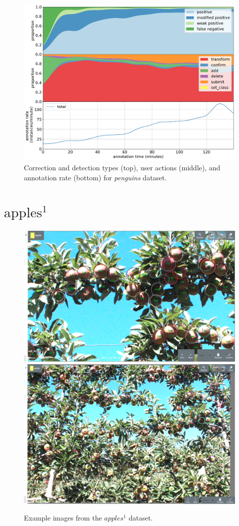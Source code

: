 \begin{figure}[!h]
\centering
\includegraphics[width=1.0\linewidth]{charts/action_annotations/penguins.pdf}
\caption{Correction and detection types (top), user actions (middle), and annotation rate (bottom) for \emph{penguins} dataset.}
\label{fig:penguin_annotation}
\end{figure}



\pagebreak
\section{\texorpdfstring{$\mathrm{apples^1}$}{}}
\label{sec:apples1_details}

\begin{figure}[!h]
  \includegraphics[width=0.475\linewidth]{figures/annotation/screenshots/apples_big.png}
  \hfill
  \includegraphics[width=0.45\linewidth]{figures/annotation/screenshots/apples_small.png}
\caption{Example images from the $apples^1$ dataset.}
\label{fig:apples1_dataset}  
\end{figure}


